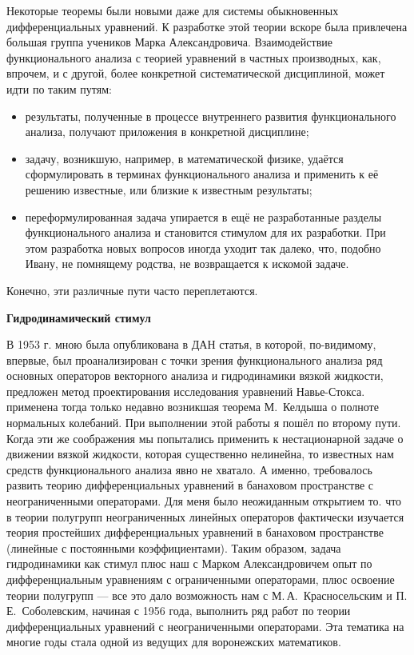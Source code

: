 Некоторые теоремы были новыми даже для системы
\linebreak
обы\-к\-но\-вен\-ных дифференциальных уравнений.
К разработке этой теории вскоре была привлечена большая группа учеников Марка Александровича. Взаимодействие функционального анализа с теорией уравнений в частных производных, как, впрочем, и с другой, более конкретной систематической дисциплиной, может идти по таким путям:
\begin{itemize}
	\item
		результаты,   полученные   в процессе внутреннего развития функционального анализа, получают приложения в конкретной дисциплине;
	\item
		задачу, возникшую, например, в математической физике, удаётся
	 сформулировать в терминах функционального анализа и применить к её решению известные, или близкие к известным результаты;
	\item
		переформулированная задача упирается в ещё не разработанные разделы функционального анализа и становится стимулом для их разработки. При этом разработка новых вопросов иногда уходит так далеко, что, подобно Ивану, не помнящему родства, не возвращается к искомой задаче.
\end{itemize}
Конечно, эти различные пути часто переплетаются.

{\bf Гидродинамический стимул}

В 1953 г. мною была опубликована в ДАН статья, в которой, по-видимому, впервые, был проанализирован с точки зрения функционального анализа ряд основных операторов векторного анализа и гидродинамики вязкой жидкости, предложен метод проектирования исследования уравнений Навье-Стокса. применена тогда только недавно возникшая теорема М.~Келдыша о полноте нормальных колебаний. При выполнении этой работы я пошёл по второму пути. Когда эти же соображения мы попытались применить к нестационарной задаче о движении вязкой жидкости, которая существенно нелинейна, то известных нам средств функционального анализа явно не хватало. А именно, требовалось развить теорию дифференциальных уравнений в банаховом пространстве с неограниченными операторами. Для меня было неожиданным открытием то. что в теории полугрупп неограниченных линейных операторов фактически изучается теория простейших дифференциальных уравнений в банаховом пространстве (линейные с постоянными коэффициентами). Таким образом, задача гидродинамики как стимул плюс наш с Марком Александровичем опыт по дифференциальным уравнениям с ограниченными операторами, плюс освоение теории полугрупп — все это дало возможность нам с М.\,А.~Красносельским и П.\,Е.~Соболевским, начиная с 1956 года, выполнить ряд работ по теории дифференциальных уравнений с неограниченными операторами. Эта тематика на многие годы стала одной из ведущих для воронежских математиков.


